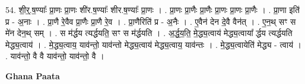 \documentclass[17pt]{extarticle}
\begin{document}
54. शी॒र्॒.ष॒ण्याः᳚ प्रा॒णः प्रा॒णः शी॑र.ष॒ण्याः᳚ शीर.ष॒ण्याः᳚ प्रा॒णः । . प्रा॒णः प्रा॒णैः प्रा॒णैः प्रा॒णः प्रा॒णः प्रा॒णैः । . प्रा॒णा इति॑ प्र - अ॒नाः । . प्रा॒णै रे॒वैव प्रा॒णैः प्रा॒णै रे॒व । . प्रा॒णैरिति॑ प्र - अ॒नैः । . ए॒वैन॑ देन दे॒वै वैन॑त् । . ए॒न॒थ् सꣳ स मे॑न देन॒थ् सम् । . स म॑र्द्धय त्यर्द्धयति॒ सꣳ स म॑र्द्धयति । . अ॒र्द्ध॒य॒ति॒ मे॒द्ध्य॒त्वाय॑ मेद्ध्य॒त्वाया᳚ र्द्धय त्यर्द्धयति मेद्ध्य॒त्वाय॑ । . मे॒द्ध्य॒त्वाय॒ याव॑न्तो॒ याव॑न्तो मेद्ध्य॒त्वाय॑ मेद्ध्य॒त्वाय॒ याव॑न्तः । . मे॒द्ध्य॒त्वायेति॑ मेद्ध्य - त्वाय॑ । . याव॑न्तो॒ वै वै याव॑न्तो॒ याव॑न्तो॒ वै । \newline

\textbf{Ghana Paata } \newline
\end{document}
